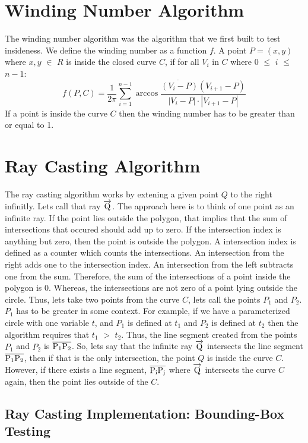 \documentclass{article}
\begin{document}
\section{Winding Number Algorithm}
The winding number algorithm was the algorithm that we first built to test insideness.
We define the winding number as a function $f$.
A point $P = (x,y)$ where $x,y$ $\in$ $R$  is inside the closed curve $C$, if for all $V_i$ in $C$ where $0$ $\leq$ $i$ $\leq$ $n-1$:
$$
f(P,C) = \frac{1}{2\pi}\sum_{i=1}^{n-1}\arccos{\frac{\dot{(V_i-P)}{(V_{i+1}-P)}}{|V_i-P|\cdot |V_{i+1}-P|}}
$$
If a point is inside the curve $C$ then the winding number has to be greater than or equal to 1.

\section{Ray Casting Algorithm}

The ray casting algorithm works by extening a given point $Q$ to the right infinitly.
Lets call that ray $\overrightarrow{\rm Q}$.
The approach here is to think of one point as an infinite ray.
If the point lies outside the polygon, that implies that the sum of intersections that occured should add up to zero.
If the intersection index is anything but zero, then the point is outside the polygon.
A intersection index is defined as a counter which counts the intersections. 
An intersection from the right adds one to the intersection index.
An intersection from the left subtracts one from the sum.
Therefore, the sum of the intersections of a point inside the polygon is 0.
Whereas, the intersections are not zero of a point lying outside the circle.
Thus, lets take two points from the curve $C$, lets call the points $P_1$ and $P_2$.
$P_1$ has to be greater in some context.
For example, if we have a parameterized circle with one variable $t$, and $P_1$ is defined at $t_1$ and $P_2$ is defined at $t_2$ then the algorithm requires that $t_1$ $>$ $t_2$.
Thus, the line segment created from the points $P_1$ and $P_2$ is $\overline{\rm P_1P_2}$.
So, lets say that the infinite ray $\overrightarrow{\rm Q}$ intersects the line segment $\overline{\rm P_1P_2}$, then if that is the only intersection, the point $Q$ is inside the curve $C$.
However, if there exists a line segment, $\overline{\rm P_iP_j}$ where $\overrightarrow{\rm Q}$ intersects the curve $C$ again, then the point lies outside of the $C$.

\subsection{Ray Casting Implementation: Bounding-Box Testing}
\end{document}
